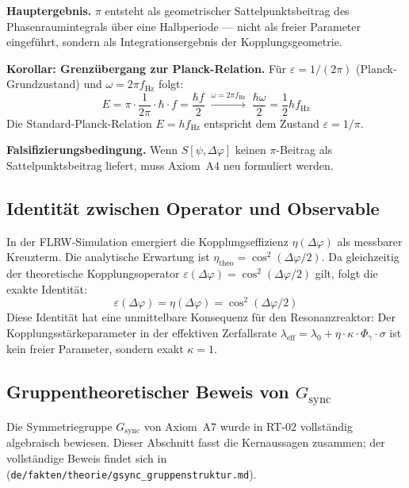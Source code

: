 \documentclass[12pt]{iopart}
\begin{document}
	\textbf{Hauptergebnis.}
	$\pi$ entsteht als geometrischer Sattelpunktsbeitrag
	des Phasenraumintegrals \"uber eine Halbperiode — nicht
	als freier Parameter eingef\"uhrt, sondern als
	Integrationsergebnis der Kopplungsgeometrie.
	
	\textbf{Korollar: Grenz\"ubergang zur Planck-Relation.}
	F\"ur $\varepsilon = 1/(2\pi)$ (Planck-Grundzustand)
	und $\omega = 2\pi f_{\mathrm{Hz}}$ folgt:
	\begin{equation}
		E = \pi\cdot\frac{1}{2\pi}\cdot\hbar\cdot f
		= \frac{\hbar f}{2}
		\;\xrightarrow{\omega = 2\pi f_{\mathrm{Hz}}}\;
		\frac{\hbar\omega}{2}
		= \frac{1}{2}h f_{\mathrm{Hz}}
		\label{eq:planck_limit}
	\end{equation}
	Die Standard-Planck-Relation $E = hf_{\mathrm{Hz}}$ entspricht
	dem Zustand $\varepsilon = 1/\pi$.
	
	\textbf{Falsifizierungsbedingung.}
	Wenn $S[\psi, \Delta\varphi]$ keinen $\pi$-Beitrag als
	Sattelpunktsbeitrag liefert, muss Axiom~A4 neu formuliert werden.
	
	\subsection{Identit\"at zwischen Operator und Observable}
	\label{sec:eps_eta}
	
	In der FLRW-Simulation emergiert die Kopplungseffizienz
	$\eta(\Delta\varphi)$ als messbarer Kreuzterm. Die
	analytische Erwartung ist
	$\eta_{\mathrm{theo}} = \cos^2(\Delta\varphi/2)$.
	Da gleichzeitig der theoretische Kopplungsoperator
	$\varepsilon(\Delta\varphi) = \cos^2(\Delta\varphi/2)$
	gilt, folgt die exakte Identit\"at:
	\begin{equation}
		\varepsilon(\Delta\varphi)
		= \eta(\Delta\varphi)
		= \cos^2(\Delta\varphi/2)
		\label{eq:eps_eta_identity}
	\end{equation}
	Diese Identit\"at hat eine unmittelbare Konsequenz f\"ur
	den Resonanzreaktor: Der Kopplungsst\"arkeparameter
	in der effektiven Zerfallsrate
	$\lambda_{\mathrm{eff}} = \lambda_0 + \eta \cdot \kappa
	\cdot \Phi_\gamma \cdot \sigma$ ist kein freier Parameter,
	sondern exakt $\kappa = 1$.
	
	\subsection{Gruppentheoretischer Beweis von $G_{\mathrm{sync}}$}
	\label{sec:gsync}
	
	Die Symmetriegruppe $G_{\mathrm{sync}}$ von Axiom~A7 wurde
	in RT-02 vollst\"andig algebraisch bewiesen. Dieser Abschnitt
	fasst die Kernaussagen zusammen; der vollst\"andige Beweis
	findet sich in~\cite{rftrepo}
	(\texttt{de/fakten/theorie/gsync\_gruppenstruktur.md}).
	
\end{document}
